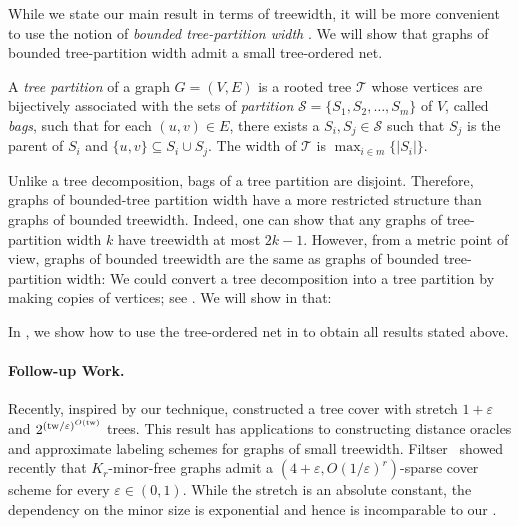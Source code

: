 \documentclass{theoretics}
\makeatletter
\newcommand{\tp}{{\rm tp}}
\newcommand{\tw}{{\rm tw}}
\newcommand{\poly}{\mathrm{poly}}
\def\eps{\varepsilon}
\newcommand\IfRestateTF{%
  \ifx\label\thmt@gobble@label %
    \expandafter\@firstoftwo
  \else
    \expandafter\@secondoftwo
  \fi
}
\newcommand{\RestateRemark}{\IfRestateTF{{\normalfont\bfseries (Restated) }}{}}
\makeatother
\begin{document}
While we state our main result in terms of treewidth, it will be more convenient to use the notion of  \emph{bounded tree-partition width} \cite{DBLP:journals/dm/DingO96}. We will show that graphs of bounded tree-partition width admit a small tree-ordered net.

\begin{definition} A \emph{tree partition} of a graph  $G=(V,E)$ is a  rooted tree $\mathcal{T}$ whose vertices are bijectively associated with the sets of  \emph{partition} $\mathcal{S} = \{S_1,S_2,\ldots,S_m\}$ of $V$, called \emph{bags}, such that for each $(u,v) \in E$, there exists a $S_i,S_j \in \mathcal{S}$ such that $S_j$ is the parent of $S_i$ and $\{u,v\} \subseteq S_i \cup S_j$. The width of $\mathcal{T}$ is $\max_{i\in m}\{|S_i|\}$.
\end{definition}


Unlike a tree decomposition, bags of a tree partition are disjoint.  Therefore, graphs of bounded-tree partition width have a more restricted structure than graphs of bounded treewidth. Indeed, one can show that any graphs of tree-partition width $k$ have treewidth at most $2k-1$. However, from a metric point of view, graphs of bounded treewidth are the same as graphs of bounded tree-partition width: We could convert a tree decomposition into a tree partition by making copies of vertices; see . We will show in  that: 



In , we show how to use the tree-ordered net in  to obtain all results stated above. 


\paragraph*{Follow-up Work.~} Recently, inspired by our technique, \cite{CCLMST23} constructed a tree cover with stretch $1+\eps$ and $2^{(\tw / \eps)^{O(\tw)}}$ trees. This result has applications to constructing distance oracles and approximate labeling schemes for graphs of small treewidth. Filtser~\cite{Filtser24} showed recently that $K_r$-minor-free graphs admit a $(4+\eps,O(1/\eps)^{r})$-sparse cover scheme for every  $\eps \in (0,1)$. While the stretch is an absolute constant, the dependency on the minor size is exponential and hence is incomparable to our .
\end{document}
